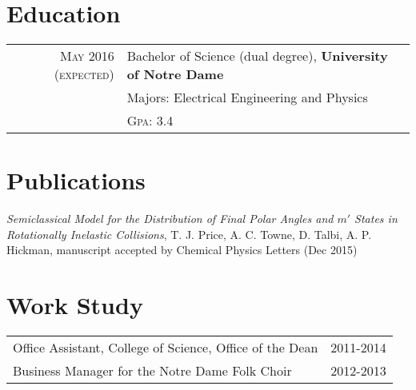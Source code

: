 \documentclass[a4paper,10pt]{article} %
\begin{document}

\section{Education}

\begin{tabular}{rl}	
\textsc{May 2016 (expected)}& Bachelor of Science (dual degree), \textbf{University of Notre Dame}\\
& Majors: Electrical Engineering and Physics\\
&\normalsize \textsc{Gpa}: 3.4
\end{tabular}


\section{Publications}

\emph{Semiclassical Model for the Distribution of Final Polar Angles and $m'$
States in Rotationally Inelastic Collisions}, T. J.
Price, A. C. Towne, D. Talbi, A. P. Hickman,
    manuscript accepted by Chemical Physics Letters (Dec 2015)


\section{Work Study}

\begin{tabular}{lr}
    Office Assistant, College of Science, Office of the Dean&2011-2014\\
    Business Manager for the Notre Dame Folk Choir&2012-2013
\end{tabular}

\end{document}
